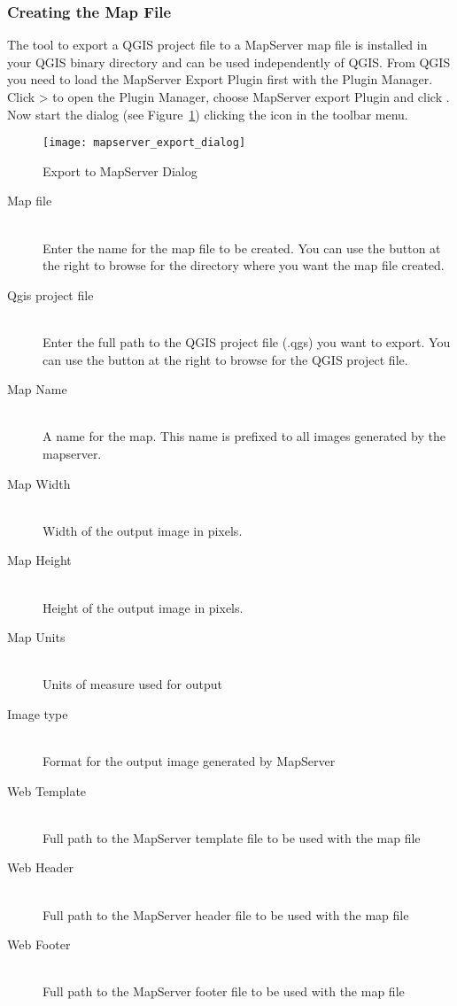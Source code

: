 \subsubsection{Creating the Map File}

The tool  to export a QGIS project file to a MapServer map 
file is installed in your QGIS binary directory and can be used independently of QGIS. 
From QGIS you need to load the MapServer Export Plugin first with the Plugin Manager. 
Click  >  to open the Plugin Manager, 
choose MapServer export Plugin and click . Now start the 
 dialog (see 
Figure~\ref{fig:mapserver_export_dialog}) clicking the icon in the toolbar menu.

\begin{figure}[ht]
\begin{center}
  \caption{Export to MapServer Dialog \nixcaption}
  \label{fig:mapserver_export_dialog}\smallskip
  \texttt{[image: mapserver\_export\_dialog]}
\end{center}
\end{figure}

\begin{description}
\item [Map file] \mbox{}\\
Enter the name for the map file to be created. You can use the button at the 
right to browse for the directory where you want the map file created. 
\item [Qgis project file] \mbox{}\\
Enter the full path to the QGIS project file (.qgs) you want to export. You can 
use the button at the right to browse for the QGIS project file.
\item [Map Name] \mbox{}\\
A name for the map. This name is prefixed to all images generated by the mapserver.
\item [Map Width] \mbox{}\\
Width of the output image in pixels.
\item [Map Height] \mbox{}\\
Height of the output image in pixels.
\item [Map Units] \mbox{}\\
Units of measure used for output
\item [Image type] \mbox{}\\
Format for the output image generated by MapServer
\item [Web Template] \mbox{}\\
Full path to the MapServer template file to be used with the map file
\item [Web Header] \mbox{}\\
Full path to the MapServer header file to be used with the map file
\item [Web Footer] \mbox{}\\
Full path to the MapServer footer file to be used with the map file
\end{description}

